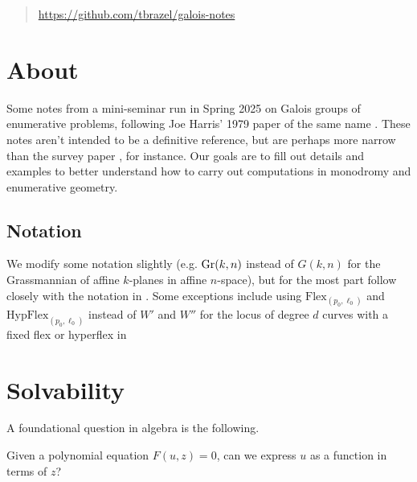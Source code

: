 \documentclass[11pt]{amsart}
\providecommand{\Flex}{\mathrm{Flex}}
\providecommand{\HypFlex}{\mathrm{HypFlex}}
\begin{document}
\begin{abstract} \href{https://github.com/tbrazel/galois-notes}{https://github.com/tbrazel/galois-notes}
\end{abstract}

\maketitle



\setcounter{section}{-1}
\section{About}

Some notes from a mini-seminar run in Spring 2025 on Galois groups of enumerative problems, following Joe Harris' 1979 paper of the same name \cite{Harris-Galois}. These notes aren't intended to be a definitive reference, but are perhaps more narrow than the survey paper \cite{SottileYahl}, for instance. Our goals are to fill out details and examples to better understand how to carry out computations in monodromy and enumerative geometry.

\subsection{Notation}

We modify some notation slightly (e.g. $\mathrm{Gr}(k,n)$ instead of $G(k,n)$ for the Grassmannian of affine $k$-planes in affine $n$-space), but for the most part follow closely with the notation in \cite{Harris-Galois}. Some exceptions include using $\Flex_{(p_0,\ell_0)}$ and $\HypFlex_{(p_0,\ell_0)}$ instead of $W'$ and $W''$ for the locus of degree $d$ curves with a fixed flex or hyperflex in 

\setcounter{tocdepth}{1}
\tableofcontents{}

\section{Solvability}

A foundational question in algebra is the following.

\begin{question}\label{solvable-bivariate-polynomial} 
Given a polynomial equation $F(u,z)=0$, can we express $u$ as a function in terms of $z$?
\end{question}
\end{document}
